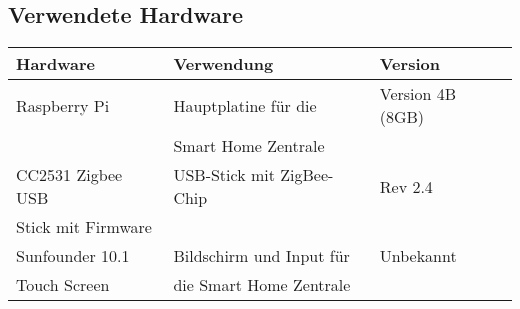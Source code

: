 \subsection{Verwendete Hardware}
\begin{tabular}{|l|l|l|}
 	\hline
 	\textbf{Hardware} & \textbf{Verwendung} & \textbf{Version} \\
 	\hline
 	Raspberry Pi & Hauptplatine für die  & Version 4B (8GB)\\
 	 & Smart Home Zentrale &\\
 	\hline
 	CC2531 Zigbee USB & USB-Stick mit ZigBee-Chip & Rev 2.4\\
 	Stick mit Firmware& & \\
 	\hline
 	Sunfounder 10.1  & Bildschirm und Input für & Unbekannt\\
 	Touch Screen & die Smart Home Zentrale & \\
 	 \hline
 \end{tabular}